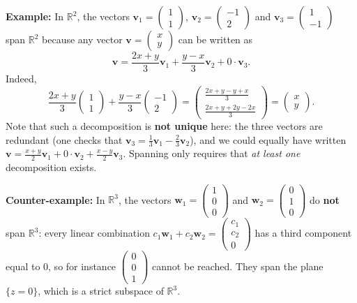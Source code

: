 \documentclass[]{article}
\begin{document}
	\noindent \textbf{Example:}
	In $\mathbb{R}^2$, the vectors
	$\mathbf{v}_1 = \begin{pmatrix} 1 \\ 1 \end{pmatrix}$,
	$\mathbf{v}_2 = \begin{pmatrix} -1 \\ 2 \end{pmatrix}$
	and
	$\mathbf{v}_3 = \begin{pmatrix} 1 \\ -1 \end{pmatrix}$
	span $\mathbb{R}^2$ because any vector
	$\mathbf{v} = \begin{pmatrix} x \\ y \end{pmatrix}$
	can be written as
	$$
	\mathbf{v} = \frac{2x+y}{3}\mathbf{v}_1 + \frac{y-x}{3}\mathbf{v}_2 + 0 \cdot \mathbf{v}_3.
	$$
	Indeed,
	$$
	\frac{2x+y}{3}\begin{pmatrix} 1 \\ 1 \end{pmatrix} + \frac{y-x}{3}\begin{pmatrix} -1 \\ 2 \end{pmatrix}
	= \begin{pmatrix} \frac{2x+y-y+x}{3} \\ \frac{2x+y+2y-2x}{3} \end{pmatrix}
	= \begin{pmatrix} x \\ y \end{pmatrix}.
	$$
	Note that such a decomposition is \textbf{not unique} here: the three vectors are redundant (one checks that $\mathbf{v}_3 = \frac{1}{3}\mathbf{v}_1 - \frac{2}{3}\mathbf{v}_2$), and we could equally have written $\mathbf{v} = \frac{x+y}{2}\mathbf{v}_1 + 0 \cdot \mathbf{v}_2 + \frac{x-y}{2}\mathbf{v}_3$.
	Spanning only requires that \textit{at least one} decomposition exists.

	\noindent \textbf{Counter-example:}
	In $\mathbb{R}^3$, the vectors
	$\mathbf{w}_1 = \begin{pmatrix} 1 \\ 0 \\ 0 \end{pmatrix}$
	and
	$\mathbf{w}_2 = \begin{pmatrix} 0 \\ 1 \\ 0 \end{pmatrix}$
	do \textbf{not} span $\mathbb{R}^3$: every linear combination $c_1\mathbf{w}_1 + c_2\mathbf{w}_2 = \begin{pmatrix} c_1 \\ c_2 \\ 0 \end{pmatrix}$ has a third component equal to $0$, so for instance $\begin{pmatrix} 0 \\ 0 \\ 1 \end{pmatrix}$ cannot be reached.
	They span the plane $\{z = 0\}$, which is a strict subspace of $\mathbb{R}^3$.
	
\end{document}
